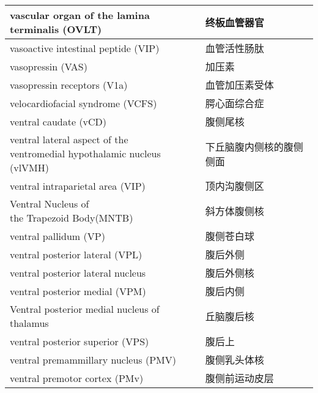 \begin{longtable}{lll}
	\midrule
	\makecell[l]{vascular organ of the lamina \\terminalis (OVLT)}   && 终板血管器官  \\
	
	\midrule
	vasoactive intestinal peptide (VIP)  && 血管活性肠肽  \\
	
	\midrule
	vasopressin (VAS)  && 加压素  \\
	
	\midrule
	vasopressin receptors (V1a)  && 血管加压素受体  \\
	
	\midrule
	velocardiofacial syndrome (VCFS)   && 腭心面综合症  \\
	
	\midrule
	ventral caudate (vCD)   && 腹侧尾核  \\
	
	\midrule
	\makecell[l]{ventral lateral aspect of the \\ventromedial hypothalamic nucleus (vlVMH)}   && 下丘脑腹内侧核的腹侧侧面  \\
	
	\midrule
	ventral intraparietal area (VIP)   && 顶内沟腹侧区  \\
	
	\midrule
	\makecell[l]{Ventral Nucleus of \\the Trapezoid Body(MNTB)}   && 斜方体腹侧核  \\
	
	\midrule
	ventral pallidum (VP)  && 腹侧苍白球  \\
	
	\midrule
	ventral posterior lateral (VPL)   && 腹后外侧  \\
	
	\midrule
	ventral posterior lateral nucleus   && 腹后外侧核  \\
	
	\midrule
	ventral posterior medial (VPM)   && 腹后内侧  \\
	
	\midrule
	Ventral posterior medial nucleus of thalamus   && 丘脑腹后核  \\
	
	\midrule
	ventral posterior superior (VPS)   && 腹后上  \\
	
	\midrule
	ventral premammillary nucleus (PMV)  && 腹侧乳头体核  \\
	
	\midrule
	ventral premotor cortex (PMv)   && 腹侧前运动皮层  \\
	

\end{longtable}
